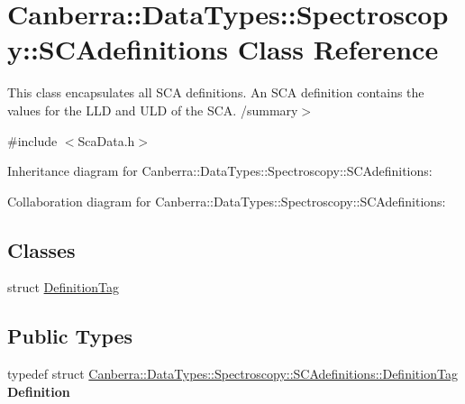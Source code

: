 \hypertarget{class_canberra_1_1_data_types_1_1_spectroscopy_1_1_s_c_adefinitions}{}\section{Canberra\+:\+:Data\+Types\+:\+:Spectroscopy\+:\+:S\+C\+Adefinitions Class Reference}
\label{class_canberra_1_1_data_types_1_1_spectroscopy_1_1_s_c_adefinitions}


This class encapsulates all S\+CA definitions. An S\+CA definition contains the values for the L\+LD and U\+LD of the S\+CA. /summary$>$  




{\ttfamily \#include $<$Sca\+Data.\+h$>$}



Inheritance diagram for Canberra\+:\+:Data\+Types\+:\+:Spectroscopy\+:\+:S\+C\+Adefinitions\+:


Collaboration diagram for Canberra\+:\+:Data\+Types\+:\+:Spectroscopy\+:\+:S\+C\+Adefinitions\+:
\subsection*{Classes}
\begin{DoxyCompactItemize}
\item 
struct \hyperlink{class_canberra_1_1_data_types_1_1_spectroscopy_1_1_s_c_adefinitions_de/d00/struct_canberra_1_1_data_types_1_1_spectroscopy_1_1_s_c_adefinitions_1_1_definition_tag}{Definition\+Tag}
\end{DoxyCompactItemize}
\subsection*{Public Types}
\begin{DoxyCompactItemize}
\item 
\mbox{\label{class_canberra_1_1_data_types_1_1_spectroscopy_1_1_s_c_adefinitions_a2b94cbdc6597ecfed4bb4c3ee8ba13eb}} 
typedef struct \hyperlink{class_canberra_1_1_data_types_1_1_spectroscopy_1_1_s_c_adefinitions_de/d00/struct_canberra_1_1_data_types_1_1_spectroscopy_1_1_s_c_adefinitions_1_1_definition_tag}{Canberra\+::\+Data\+Types\+::\+Spectroscopy\+::\+S\+C\+Adefinitions\+::\+Definition\+Tag} {\bfseries Definition}
\end{DoxyCompactItemize}
